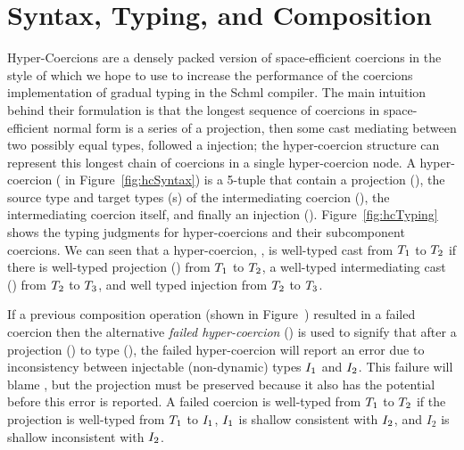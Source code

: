 \documentclass[acmtog, authorversion, acmlarge]{acmart}
\begin{document}
\newcommand{\cmp}[2]{\ensuremath{#1 \fatsemi #2}}
\newcommand{\cmpm}[2]{\cmp{#1}{#2}}

\newcommand{\depth}[1]{\ensuremath{\mid #1 \mid}}
\newcommand{\Max}[1]{\ensuremath{\texttt{max}(#1)}}

\newcommand{\interp}[3]{%
  \ensuremath{\llbracket #1 \rrbracket_{#3}^{#2}}}

\newcommand{\interpm}[3]{%
  \ensuremath{\llbracket \overline{#1} \rrbracket_{#3}^{#2}}}


\section{Syntax, Typing, and Composition}
\label{sec:hc}

Hyper-Coercions are a densely packed version of space-efficient
coercions in the style of \citet{Siek:2015ab} which we hope to use to
increase the performance of the coercions implementation of gradual
typing in the Schml compiler. The main intuition behind their
formulation is that the longest sequence of coercions in
space-efficient normal form is a series of a projection, then some
cast mediating between two possibly equal types, followed a injection;
the hyper-coercion structure can represent this longest chain of
coercions in a single hyper-coercion node. A hyper-coercion (\HC \; in
Figure~\ref{fig:hcSyntax}) is a 5-tuple that contain a projection
(\Prj), the source type and target types (\T{}s) of the intermediating
coercion (\Med), the intermediating coercion itself, and finally an
injection (\Inj). Figure~\ref{fig:hcTyping} shows the typing judgments
for hyper-coercions and their subcomponent coercions.  We can seen
that a hyper-coercion, , is
well-typed cast from $T_1$ to $T_2$ if there is well-typed
projection (\Prj) from $T_1$ to $T_2$, a well-typed intermediating
cast (\Med) from $T_2$ to $T_3$, and well typed injection from
$T_2$ to $T_3$.

If a previous composition operation (shown in
Figure~) resulted in a failed coercion then the
alternative \emph{failed hyper-coercion}
() is used to signify that
after a projection (\Prj) to type (\T), the failed hyper-coercion will
report an error due to inconsistency between injectable (non-dynamic)
types $I_1$ and $I_2$. This failure will blame \Lbl, but the
projection must be preserved because it also has the potential before
this error is reported. A failed coercion is well-typed from $T_1$ to
$T_2$ if the projection is well-typed from $T_1$ to $I_1$, $I_1$
is shallow consistent with $I_2$, and $I_2$ is shallow inconsistent
with $I_2$.
\end{document}

